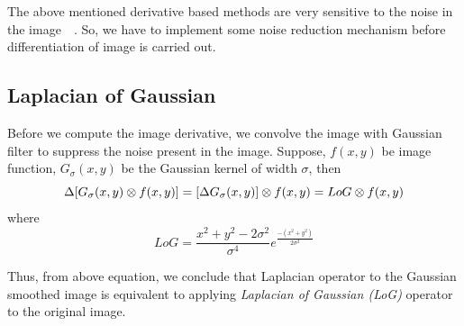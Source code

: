 \noindent The above mentioned derivative based methods are very sensitive to the noise in the image~\cite{ziou:98}~\cite{lindegerg:96}. So, we have to implement some noise reduction mechanism before differentiation of image is carried out. 

\subsection{Laplacian of Gaussian}
Before we compute the image derivative, we convolve the image with Gaussian filter to suppress the noise present in the image. Suppose, $f(x,y)$ be image function, $G_\sigma(x,y)$ be the Gaussian kernel of width $\sigma$, then
\begin{equation}
\Delta [G_\sigma(x,y) \otimes f(x,y)]=[\Delta G_\sigma(x,y)] \otimes f(x,y) = LoG \otimes f(x,y)\\
\label{eq:LoG1}
\end{equation}
where
\begin{equation}
LoG=\frac{x^2+y^2-2\sigma^2}{\sigma^4}e^{\frac{-(x^2+y^2)}{2\sigma^2}}
\label{eq:LoG2}
\end{equation}

\noindent Thus, from above equation, we conclude that Laplacian operator to the Gaussian smoothed image is equivalent to applying \emph{Laplacian of Gaussian (LoG)} operator to the original image. 

